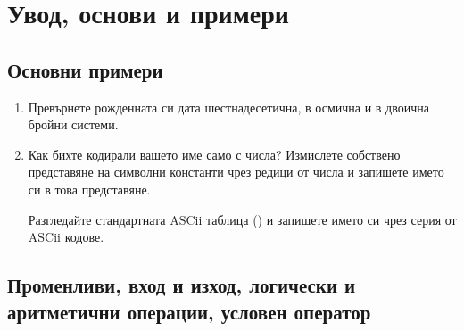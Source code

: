 \clearpage\section {Увод, основи и примери}

\subsection {Основни примери}

\begin{enumerate}

	\item Превърнете рожденната си дата шестнадесетична, в осмична и в двоична бройни системи.

	\item Как бихте кодирали вашето име само с числа? Измислете собствено представяне на символни константи чрез редици от числа и запишете името си в това представяне.

	Разгледайте стандартната ASCii таблица () и запишете името си чрез серия от ASCii кодове.

\end{enumerate}

\subsection {Променливи, вход и изход, логически и аритметични операции, условен оператор}

